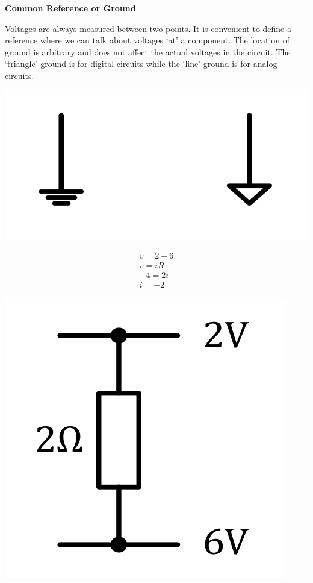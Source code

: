 \documentclass[12pt]{article}
\begin{document}
\begin{theorem*}
  \textbf{Common Reference or Ground}

  Voltages are always measured between two points.
  It is convenient to define a reference where we can talk about voltages `at' a component.
  The location of ground is arbitrary and does not affect the actual voltages in the circuit.
  The `triangle' ground is for digital circuits while the `line' ground is for analog circuits.
\end{theorem*}
\begin{marginfigure}
  \vspace{ -1.8cm }
  \includegraphics[scale=0.2]{grounds}
\end{marginfigure}


\begin{example}
  \begin{gather*}
    v = 2 - 6 \\
    v = iR \\
    -4 = 2i \\
    i = -2
  \end{gather*}
\end{example}
\begin{marginfigure}
  \vspace{ -1.5cm }
  \includegraphics[scale=0.2]{example3}
\end{marginfigure}
\end{document}
